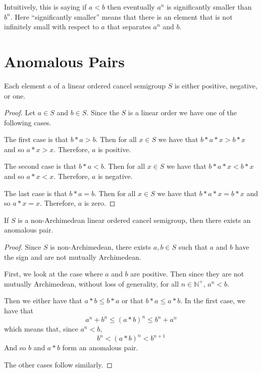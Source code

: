 Intuitively, this is saying if $a < b$ then eventually $a^n$
is significantly smaller than $b^n$. Here ``significantly smaller''
means that there is an element that is not infinitely small
with respect to $a$ that separates $a^n$ and $b$.

\section{Anomalous Pairs}

\begin{theorem}\label{thm:pos_neg_or_one}\leanok
Each element $a$ of a linear ordered cancel semigroup $S$ is either positive, negative, or one.
\end{theorem}
\begin{proof}\leanok
Let $a\in S$ and $b\in S$. Since the $S$ is a linear order we have one of the following cases.

The first case is that $b * a > b$. Then for all $x\in S$ we have that $b * a * x > b * x$
and so $a * x > x$. Therefore, $a$ is positive.

The second case is that $b * a < b$. Then for all $x\in S$ we have that $b * a * x < b * x$
and so $a * x < x$. Therefore, $a$ is negative.

The last case is that $b * a = b$. Then for all $x\in S$ we have that $b * a * x = b * x$
and so $a * x = x$. Therefore, $a$ is zero.
\end{proof}

\begin{theorem}\label{non_arch_anomalous}\leanok
{}
If $S$ is a non-Archimedean linear ordered cancel semigroup, then there exists an anomalous pair.
\end{theorem}
\begin{proof}\leanok
Since $S$ is non-Archimedean, there exists $a,b\in S$ such that
$a$ and $b$ have the sign and are not mutually Archimedean.

First, we look at the case where $a$ and $b$ are positive.
Then since they are not mutually Archimedean, without loss of generality, for all $n\in \mathbb{N}^+$,
$a^n < b$.

Then we either have that $a * b \le b * a$ or that $b*a\le a * b$.
In the first case, we have that
\[
a^n + b^n \le (a*b)^n \le b^n + a^n
\]
which means that, since $a^n < b$,
\[
b^n < (a*b)^n < b^{n+1}
\]
And so $b$ and $a*b$ form an anomalous pair.

The other cases follow similarly.
\end{proof}

